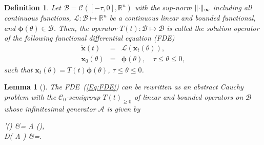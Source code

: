 \documentclass[journal]{IEEEtran}
\newtheorem{lem}{Lemma}
\newtheorem{defn}{Definition}
\DeclarePairedDelimiter{\norm}{\lVert}{\rVert}
\newcommand{\parp}[1]{\left({#1}\right)}
\newcommand{\parB}[1]{\lbrace{#1}\rbrace}
\def\A{ \mathcal A }
\begin{document}
\begin{defn}
	Let $ \mathcal B=\mathcal C([-\tau,0],\mathbb R^n) $ with the sup-norm $ \norm{\cdot}_\infty $ including all continuous functions,  $ \mathcal L: \mathcal B \mapsto \mathbb R^n $ be  a continuous linear and bounded functional, and $\boldsymbol \phi (\theta)\in \mathcal B $. Then, the operator $ T(t):\mathcal B \mapsto \mathcal B $ is called the solution operator of the following functional differential equation (FDE)
	\begin{eqnarray}\label{Eq:FDE} \nonumber
		\dot{\mathbf x}(t)&=&\mathcal L\parp{ \mathbf x_t(\theta) },
		\\
		{\mathbf x}_0(\theta)& =&  \boldsymbol\phi(\theta), \quad \tau \leq \theta\leq 0,
	\end{eqnarray}
	such that $ \mathbf x_t (\theta)= T(t)\boldsymbol \phi(\theta) $, $ \tau \leq \theta \leq 0$.
\end{defn}



\begin{lem}[{\cite[Lemma 1.2 (Sec 7)]{Hale2013introduction}}]\label{lem:infinit}
	The FDE~(\ref{Eq:FDE}) can be rewritten as an abstract Cauchy problem with the $ \mathcal C_0 $-semigroup $ T(t) _{\geq 0} $ of linear and bounded operators on $ \mathcal B $ whose infinitesimal generator $ \A $ is given by
	\begin{flalign}\label{Eq:AODE}\nonumber
		\boldsymbol \phi '(\theta) &= \A\boldsymbol \phi (\theta),
		\\
		\mathcal D(\A) &=\parB{\boldsymbol\phi(\theta)\in \mathcal B\colon{\boldsymbol\phi}'(\theta)\in \mathcal B,\;  \boldsymbol \phi'(0)=\mathcal L\parp{\boldsymbol\phi(\theta)}}.
	\end{flalign}
\end{lem}
\end{document}

